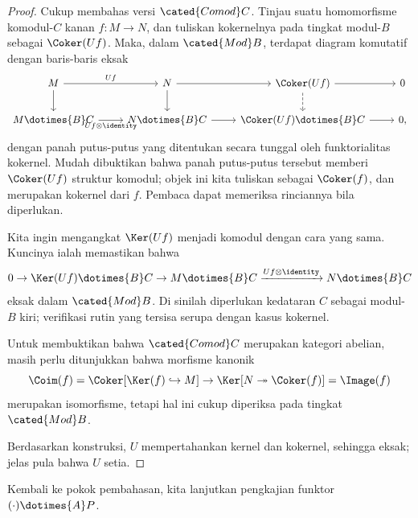 \begin{proof}
	Cukup membahas versi $\cated{Comod}C$. Tinjau suatu homomorfisme komodul-$C$
	kanan $f:M\to N$, dan tuliskan kokernelnya pada tingkat modul-$B$ sebagai
	$\Coker(Uf)$. Maka, dalam $\cated{Mod}B$, terdapat diagram komutatif dengan
	baris-baris eksak
	\[\begin{tikzcd}
		M \arrow[r, "Uf"] \arrow[d] & N \arrow[d] \arrow[r] & \Coker(Uf) \arrow[dashed, d] \arrow[r] & 0 \\
		M \dotimes{B} C \arrow[r, "{Uf \otimes \identity}"'] & N \dotimes{B} C \arrow[r] & \Coker(Uf) \dotimes{B} C \arrow[r] & 0,
	\end{tikzcd}\]
	dengan panah putus-putus yang ditentukan secara tunggal oleh
	funktorialitas kokernel. Mudah dibuktikan bahwa panah putus-putus tersebut
	memberi $\Coker(Uf)$ struktur komodul; objek ini kita tuliskan sebagai
	$\Coker(f)$, dan merupakan kokernel dari $f$. Pembaca dapat memeriksa
	rinciannya bila diperlukan.

	Kita ingin mengangkat $\Ker(Uf)$ menjadi komodul dengan cara yang sama.
	Kuncinya ialah memastikan bahwa
	\[ 0 \to \Ker(Uf) \dotimes{B} C \to M \dotimes{B} C \xrightarrow{Uf \otimes \identity} N \dotimes{B} C \]
	eksak dalam $\cated{Mod}B$. Di sinilah diperlukan kedataran $C$ sebagai
	modul-$B$ kiri; verifikasi rutin yang tersisa serupa dengan kasus kokernel.

	Untuk membuktikan bahwa $\cated{Comod}C$ merupakan kategori abelian, masih
	perlu ditunjukkan bahwa morfisme kanonik
	\[ \Coim(f) = \Coker[\Ker(f) \hookrightarrow M] \to \Ker[N \twoheadrightarrow \Coker(f)] = \Image(f) \]
	merupakan isomorfisme, tetapi hal ini cukup diperiksa pada tingkat
	$\cated{Mod}B$.

	Berdasarkan konstruksi, $U$ mempertahankan kernel dan kokernel, sehingga
	eksak; jelas pula bahwa $U$ setia.
\end{proof}

Kembali ke pokok pembahasan, kita lanjutkan pengkajian funktor
$(\mathord\cdot)\dotimes{A}P$.

